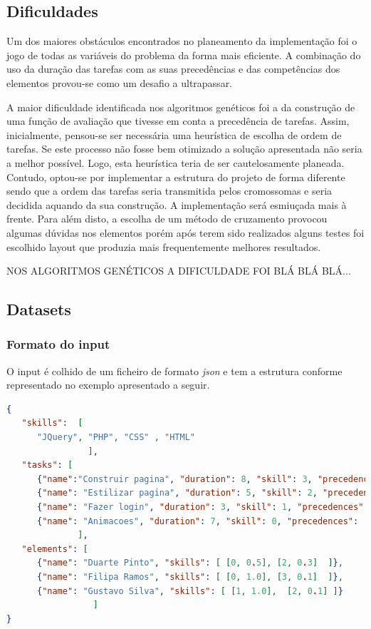 \begin{titlepage}
\subsection{Dificuldades}
\justify\normalsize
Um dos maiores obstáculos encontrados no planeamento da implementação foi o jogo de todas as variáveis do problema da forma mais eficiente. A combinação do uso da duração das tarefas com as suas precedências e das competências dos elementos provou-se como um desafio a ultrapassar.

A maior dificuldade identificada nos algoritmos genéticos foi a da construção de uma função de avaliação que tivesse em conta a precedência de tarefas. Assim, inicialmente, pensou-se ser necessária uma heurística de escolha de ordem de tarefas. Se este processo não fosse bem otimizado a solução apresentada não seria a melhor possível. Logo, esta heurística teria de ser cautelosamente planeada. Contudo, optou-se por implementar a estrutura do projeto de forma diferente sendo que a ordem das tarefas seria transmitida pelos cromossomas e seria decidida aquando da sua construção. A implementação será esmiuçada mais à frente. Para além disto, a escolha de um método de cruzamento provocou algumas dúvidas nos elementos porém após terem sido realizados alguns testes foi escolhido layout que produzia mais frequentemente melhores resultados.

NOS ALGORITMOS GENÉTICOS A DIFICULDADE FOI BLÁ BLÁ BLÁ...

\subsection{Datasets}

\subsubsection{Formato do input}

O input é colhido de um ficheiro de formato \textit{json} e tem a estrutura conforme representado no exemplo apresentado a seguir. 

\begin{lstlisting}[language=json,firstnumber=1]
{ 
   "skills":  [ 
      "JQuery", "PHP", "CSS" , "HTML"
                ], 
   "tasks": [
      {"name":"Construir pagina", "duration": 8, "skill": 3, "precedences":[]},
      {"name": "Estilizar pagina", "duration": 5, "skill": 2, "precedences": [0]},
      {"name": "Fazer login", "duration": 3, "skill": 1, "precedences": [0, 1]},
      {"name": "Animacoes", "duration": 7, "skill": 0, "precedences": [0, 1]}
              ],
   "elements": [
      {"name": "Duarte Pinto", "skills": [ [0, 0.5], [2, 0.3]  ]},
      {"name": "Filipa Ramos", "skills": [ [0, 1.0], [3, 0.1]  ]},
      {"name": "Gustavo Silva", "skills": [ [1, 1.0],  [2, 0.1] ]}
                 ]
}
\end{lstlisting}


\end{titlepage}
